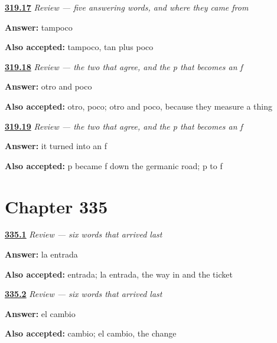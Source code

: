 \noindent\begin{minipage}[t]{\linewidth}
\raggedright
\hyperlink{review-ES-C319-repaso-respuestas-few}{\textbf{319.17}} \emph{Review — five answering words, and where they came from}\par
\small \textbf{Answer:} tampoco\par
\footnotesize \textbf{Also accepted:} tampoco, tan plus poco
\end{minipage}\par\medskip

\noindent\begin{minipage}[t]{\linewidth}
\raggedright
\hyperlink{review-ES-C319-otro-y-poco-agree}{\textbf{319.18}} \emph{Review — the two that agree, and the p that becomes an f}\par
\small \textbf{Answer:} otro and poco\par
\footnotesize \textbf{Also accepted:} otro, poco; otro and poco, because they measure a thing
\end{minipage}\par\medskip

\noindent\begin{minipage}[t]{\linewidth}
\raggedright
\hyperlink{review-ES-C319-otro-y-poco-shift}{\textbf{319.19}} \emph{Review — the two that agree, and the p that becomes an f}\par
\small \textbf{Answer:} it turned into an f\par
\footnotesize \textbf{Also accepted:} p became f down the germanic road; p to f
\end{minipage}\par\medskip

\section*{Chapter 335}

\noindent\begin{minipage}[t]{\linewidth}
\raggedright
\hyperlink{review-ES-C335-repaso-seis-palabras-entrada}{\textbf{335.1}} \emph{Review --- six words that arrived last}\par
\small \textbf{Answer:} la entrada\par
\footnotesize \textbf{Also accepted:} entrada; la entrada, the way in and the ticket
\end{minipage}\par\medskip

\noindent\begin{minipage}[t]{\linewidth}
\raggedright
\hyperlink{review-ES-C335-repaso-seis-palabras-cambio}{\textbf{335.2}} \emph{Review --- six words that arrived last}\par
\small \textbf{Answer:} el cambio\par
\footnotesize \textbf{Also accepted:} cambio; el cambio, the change
\end{minipage}\par\medskip

